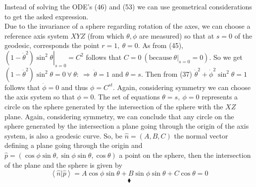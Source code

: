 Instead of solving the ODE's (46) and (53) we can use geometrical considerations to get the asked expression.\\ Due to the invariance of a sphere regarding rotation of the axes, we can choose a reference axis system $XYZ$ (from which $\theta, \phi$ are measured) so that at $s=0$ of the geodesic,  corresponds the point $r=1, \ \theta = 0$. As  from (45),  $\left.(1-\dot{\theta}^2)\sin^2\theta \right |_{s=0} = C^2$ follows that $C=0 \ (\text{because} \ \left.\theta \right |_{s=0} = 0)$. So we get $(1-\dot{\theta}^2)\sin^2\theta  = 0 \ \forall \ \theta : \ \Rightarrow \ \dot{\theta} = 1$ and  $\theta =s$. Then from (37) $\dot{\theta}^2+\dot{\phi}^2\sin^2\theta = 1$  follows that $\dot{\phi}= 0$ and thus $\phi = C^{st}$. Again, considering symmetry we can choose the axis system so that $\phi = 0$. The set of equations $ \theta =s, \ \phi = 0$ represents a circle on the sphere generated by the intersection of the sphere with the $XZ$ plane. Again, considering symmetry, we can conclude that any circle on the sphere generated by the intersection a plane going through the origin of the axis system, is also a geodesic curve. So, be $\widehat{n} = (A,B,C)$ the normal vector defining a plane going through the origin and $\widehat{p} = (\cos\phi \sin\theta,\sin\phi \sin\theta,\cos\theta)$ a point on the sphere, then the intersection of the plane and the sphere is given by $$\left<\widehat{n} | \widehat{p}\right> = A\cos\phi \sin\theta+ B\sin\phi \sin\theta+ C\cos\theta = 0$$
$$\blacklozenge$$
\newpage

